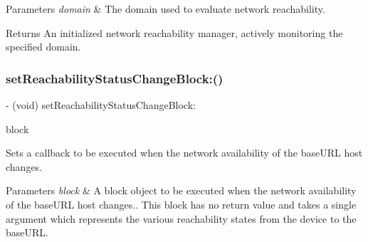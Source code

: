 \begin{DoxyParams}{Parameters}
{\em domain} & The domain used to evaluate network reachability.\\
\hline
\end{DoxyParams}
\begin{DoxyReturn}{Returns}
An initialized network reachability manager, actively monitoring the specified domain. 
\end{DoxyReturn}
\mbox{\label{interface_a_f_network_reachability_manager_ad0cbd4cc75749ec8e6ee383b91ae51bd}} 
\subsubsection{\texorpdfstring{set\+Reachability\+Status\+Change\+Block\+:()}{setReachabilityStatusChangeBlock:()}\hspace{0.1cm}{\footnotesize\ttfamily [1/3]}}
{\footnotesize\ttfamily -\/ (void) set\+Reachability\+Status\+Change\+Block\+: \begin{DoxyParamCaption}\item[{(nullable void($^\wedge$)(A\+F\+Network\+Reachability\+Status status))}]{block }\end{DoxyParamCaption}}

Sets a callback to be executed when the network availability of the {\ttfamily base\+U\+RL} host changes.


\begin{DoxyParams}{Parameters}
{\em block} & A block object to be executed when the network availability of the {\ttfamily base\+U\+RL} host changes.. This block has no return value and takes a single argument which represents the various reachability states from the device to the {\ttfamily base\+U\+RL}. \\
\hline
\end{DoxyParams}
\mbox{\label{interface_a_f_network_reachability_manager_ad0cbd4cc75749ec8e6ee383b91ae51bd}} 
